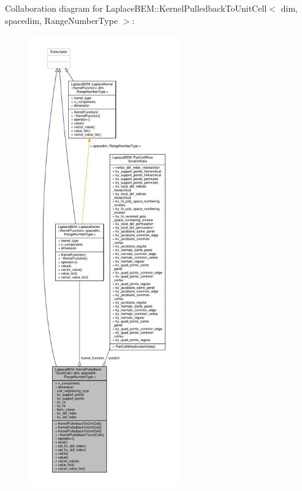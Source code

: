 Collaboration diagram for Laplace\+B\+EM\+:\+:Kernel\+Pulledback\+To\+Unit\+Cell$<$ dim, spacedim, Range\+Number\+Type $>$\+:\nopagebreak
\begin{figure}[H]
\begin{center}
\leavevmode
\includegraphics[height=550pt]{classLaplaceBEM_1_1KernelPulledbackToUnitCell__coll__graph}
\end{center}
\end{figure}
